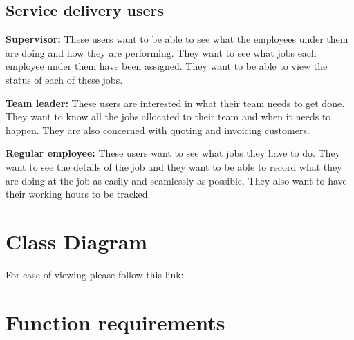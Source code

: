 \documentclass{article}
\begin{document}
	\subsection*{Service delivery users}
	\begin{list}{.}{}
		\item \textbf{Supervisor:} These users want to be able to see what the employees under them are doing and how they are performing. They want to see what jobs each employee under them have been assigned. They want to be able to view the status of each of these jobs. 
		\item \textbf{Team leader:} These users are interested in what their team needs to get done. They want to know all the jobs allocated to their team and when it needs to happen. They are also concerned with quoting and invoicing customers.
		\item \textbf{Regular employee:} These users want to see what jobs they have to do. They want to see the details of the job and they want to be able to record what they are doing at the job as easily and seamlessly as possible. They also want to have their working hours to be tracked.
	\end{list}
	
	
	\newpage
	
	\section*{Class Diagram}	
	For ease of viewing please follow this link: 
	
	\newpage

	
	\section*{Function requirements}
\end{document}

